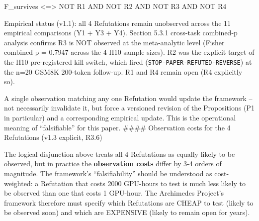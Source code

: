 \documentclass[11pt]{article}
\begin{document}
F\_survives \textless=\textgreater{} NOT R1 AND NOT R2 AND NOT R3 AND
NOT R4

Empirical status (v1.1): all 4 Refutations remain unobserved across the
11 empirical comparisons (Y1 + Y3 + Y4). Section 5.3.1 cross-task
combined-p analysis confirms R3 is NOT observed at the meta-analytic
level (Fisher combined-p = 0.7947 across the 4 H10 sample sizes). R2 was
the explicit target of the H10 pre-registered kill switch, which fired
(\texttt{STOP-PAPER-REFUTED-REVERSE}) at the n=20 GSM8K 200-token
follow-up. R1 and R4 remain open (R4 explicitly so).

A single observation matching any one Refutation would update the
framework -- not necessarily invalidate it, but force a versioned
revision of the Propositions (P1 in particular) and a corresponding
empirical update. This is the operational meaning of ``falsifiable'' for
this paper. \#\#\#\# Observation costs for the 4 Refutations (v1.3
explicit, R3.6)

The logical disjunction above treats all 4 Refutations as equally likely
to be observed, but in practice the \textbf{observation costs} differ by
3-4 orders of magnitude. The framework's ``falsifiability'' should be
understood as cost-weighted: a Refutation that costs 2000 GPU-hours to
test is much less likely to be observed than one that costs 1 GPU-hour.
The Archimedes Project's framework therefore must specify which
Refutations are CHEAP to test (likely to be observed soon) and which are
EXPENSIVE (likely to remain open for years).
\end{document}
